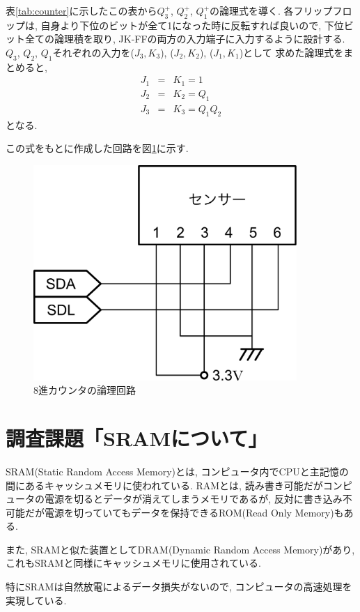 \documentclass[titlepage]{jsarticle}
\begin{document}
    表\ref{tab:counter}に示したこの表から$Q_3^+$, $Q_2^+$, $Q_1^+$の論理式を導く.
    各フリップフロップは, 自身より下位のビットが全て1になった時に反転すれば良いので,
    下位ビット全ての論理積を取り, JK-FFの両方の入力端子に入力するように設計する.
    $Q_3$, $Q_2$, $Q_1$それぞれの入力を($J_3, K_3$), ($J_2, K_2$), ($J_1, K_1$)として
    求めた論理式をまとめると,
    \begin{eqnarray*}
      J_1 &=& K_1 = 1 \\
      J_2 &=& K_2 = Q_1 \\
      J_3 &=& K_3 = Q_1Q_2
    \end{eqnarray*}
    となる.

    この式をもとに作成した回路を図\ref{fig:counter}に示す.
    \begin{figure}[h]
      \centering
      \includegraphics[width=10cm]{images/haisen.pdf}
      \caption{8進カウンタの論理回路}
      \label{fig:counter}
    \end{figure}
\section{調査課題「SRAMについて」}
  SRAM(Static Random Access Memory)とは, コンピュータ内でCPUと主記憶の間にあるキャッシュメモリに使われている.
  RAMとは, 読み書き可能だがコンピュータの電源を切るとデータが消えてしまうメモリであるが,
  反対に書き込み不可能だが電源を切っていてもデータを保持できるROM(Read Only Memory)もある.

  また, SRAMと似た装置としてDRAM(Dynamic Random Access Memory)があり,
  これもSRAMと同様にキャッシュメモリに使用されている.

  特にSRAMは自然放電によるデータ損失がないので,
  コンピュータの高速処理を実現している.
\end{document}
